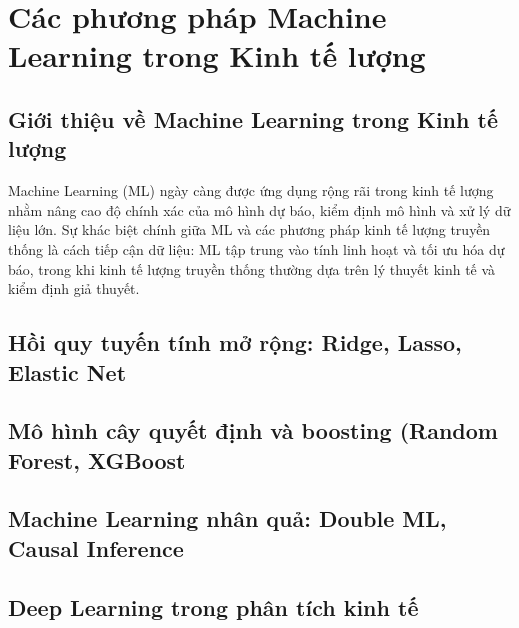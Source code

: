 \chapter{Các phương pháp Machine Learning trong Kinh tế lượng}
\section{Giới thiệu về Machine Learning trong Kinh tế lượng}
Machine Learning (ML) ngày càng được ứng dụng rộng rãi trong kinh tế lượng nhằm nâng cao độ chính xác của mô hình dự báo, kiểm định mô hình và xử lý dữ liệu lớn. Sự khác biệt chính giữa ML và các phương pháp kinh tế lượng truyền thống là cách tiếp cận dữ liệu: ML tập trung vào tính linh hoạt và tối ưu hóa dự báo, trong khi kinh tế lượng truyền thống thường dựa trên lý thuyết kinh tế và kiểm định giả thuyết.

\section{Hồi quy tuyến tính mở rộng: Ridge, Lasso, Elastic Net}

\section{Mô hình cây quyết định và boosting (Random Forest, XGBoost}

\section{Machine Learning nhân quả: Double ML, Causal Inference}

\section{Deep Learning trong phân tích kinh tế}




